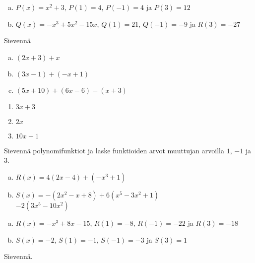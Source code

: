 \begin{tehtavasivu}
\begin{tehtava}
	\begin{vastaus}
		\begin{enumerate}[a)]
			\item $P(x)=x^2+3$, $P(1)=4$, $P(-1)=4$ ja $P(3)=12$
			\item $Q(x)=-x^3+5x^2-15x$, $Q(1)=21$, $Q(-1)=-9$ ja $R(3)=-27$
		\end{enumerate}
	\end{vastaus}
\end{tehtava}

\begin{tehtava}
     Sievennä
     \begin{enumerate}[a)]
         \item $(2x + 3) + x $
         \item $(3x - 1) + (-x + 1)$
         \item $(5x + 10) + (6x - 6) - (x + 3)$
     \end{enumerate}
     \begin{vastaus}
         \begin{enumerate}
             \item $3x + 3$
             \item $2x$
             \item $10x + 1$
         \end{enumerate}
     \end{vastaus}
 \end{tehtava}

\begin{tehtava}
	Sievennä polynomifunktiot ja laske funktioiden arvot muuttujan arvoilla $1$, $-1$ ja $3$.
	\begin{enumerate}[a)]
		\item $R(x)=4(2x-4)+(-x^3+1)$
		\item $S(x)=-(2x^2-x+8)+6(x^5-3x^2+1)$ \\ $-2(3x^5-10x^2)$
	\end{enumerate}
	\begin{vastaus}
		\begin{enumerate}[a)]
			\item $R(x)=-x^3+8x-15$, $R(1)=-8$, $R(-1)=-22$ ja $R(3)=-18$
			\item $S(x)=-2$, $S(1)=-1$, $S(-1)=-3$ ja $S(3)=1$
		\end{enumerate}
	\end{vastaus}
\end{tehtava}

\begin{tehtava}
    Sievennä.
    \begin{alakohdat}
    \end{alakohdat}
    \begin{vastaus}
        \begin{alakohdat}
        \end{alakohdat}
    \end{vastaus}
\end{tehtava}


\end{tehtavasivu}
